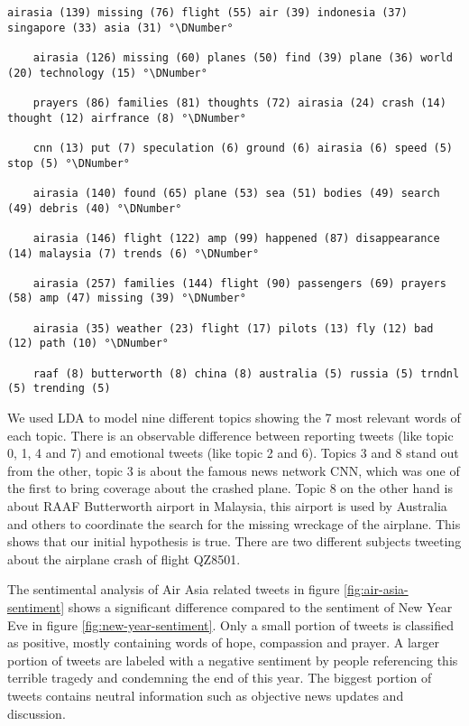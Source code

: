 \begin{lstlisting}[caption={[Topic Model for Air Asia Flight Tragedy] Topic Model for Air Asia Flight Tragedy}, label={lst:topic-model-air-asia}, float=h]
	airasia (139) missing (76) flight (55) air (39) indonesia (37) singapore (33) asia (31) °\DNumber°

	airasia (126) missing (60) planes (50) find (39) plane (36) world (20) technology (15) °\DNumber°

	prayers (86) families (81) thoughts (72) airasia (24) crash (14) thought (12) airfrance (8) °\DNumber°

	cnn (13) put (7) speculation (6) ground (6) airasia (6) speed (5) stop (5) °\DNumber°

	airasia (140) found (65) plane (53) sea (51) bodies (49) search (49) debris (40) °\DNumber°

	airasia (146) flight (122) amp (99) happened (87) disappearance (14) malaysia (7) trends (6) °\DNumber°

	airasia (257) families (144) flight (90) passengers (69) prayers (58) amp (47) missing (39) °\DNumber°

	airasia (35) weather (23) flight (17) pilots (13) fly (12) bad (12) path (10) °\DNumber°

	raaf (8) butterworth (8) china (8) australia (5) russia (5) trndnl (5) trending (5)
\end{lstlisting}

We used LDA to model nine different topics showing the 7 most relevant words of each topic. There is an observable difference between reporting tweets (like topic 0, 1, 4 and 7) and emotional tweets (like topic 2 and 6). Topics 3 and 8 stand out from the other, topic 3 is about the famous news network CNN, which was one of the first to bring coverage about the crashed plane. Topic 8 on the other hand is about RAAF Butterworth airport in Malaysia, this airport is used by Australia and others to coordinate the search for the missing wreckage of the airplane.
This shows that our initial hypothesis is true. There are two different subjects tweeting about the airplane crash of flight QZ8501.

The sentimental analysis of Air Asia related tweets in figure \ref{fig:air-asia-sentiment} shows a significant difference compared to the sentiment of New Year Eve in figure \ref{fig:new-year-sentiment}. Only a small portion of tweets is classified as positive, mostly containing words of hope, compassion and prayer. A larger portion of tweets are labeled with a negative sentiment by people referencing this terrible tragedy and condemning the end of this year. The biggest portion of tweets contains neutral information such as objective news updates and discussion.

